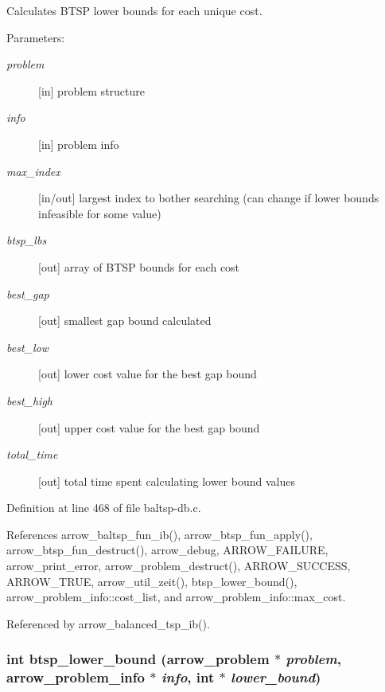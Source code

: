 Calculates BTSP lower bounds for each unique cost. 

\begin{Desc}
\item[Parameters:]
\begin{description}
\item[{\em problem}]\mbox{[}in\mbox{]} problem structure \item[{\em info}]\mbox{[}in\mbox{]} problem info \item[{\em max\_\-index}]\mbox{[}in/out\mbox{]} largest index to bother searching (can change if lower bounds infeasible for some value) \item[{\em btsp\_\-lbs}]\mbox{[}out\mbox{]} array of BTSP bounds for each cost \item[{\em best\_\-gap}]\mbox{[}out\mbox{]} smallest gap bound calculated \item[{\em best\_\-low}]\mbox{[}out\mbox{]} lower cost value for the best gap bound \item[{\em best\_\-high}]\mbox{[}out\mbox{]} upper cost value for the best gap bound \item[{\em total\_\-time}]\mbox{[}out\mbox{]} total time spent calculating lower bound values \end{description}
\end{Desc}


Definition at line 468 of file baltsp-db.c.

References arrow\_\-baltsp\_\-fun\_\-ib(), arrow\_\-btsp\_\-fun\_\-apply(), arrow\_\-btsp\_\-fun\_\-destruct(), arrow\_\-debug, ARROW\_\-FAILURE, arrow\_\-print\_\-error, arrow\_\-problem\_\-destruct(), ARROW\_\-SUCCESS, ARROW\_\-TRUE, arrow\_\-util\_\-zeit(), btsp\_\-lower\_\-bound(), arrow\_\-problem\_\-info::cost\_\-list, and arrow\_\-problem\_\-info::max\_\-cost.

Referenced by arrow\_\-balanced\_\-tsp\_\-ib().\hypertarget{lib_2baltsp_2baltsp-db_8c_90a22293c99499a2da22fd0d1a16acb4}{
\subsubsection[{btsp\_\-lower\_\-bound}]{\setlength{\rightskip}{0pt plus 5cm}int btsp\_\-lower\_\-bound ({\bf arrow\_\-problem} $\ast$ {\em problem}, \/  {\bf arrow\_\-problem\_\-info} $\ast$ {\em info}, \/  int $\ast$ {\em lower\_\-bound})}}
\label{lib_2baltsp_2baltsp-db_8c_90a22293c99499a2da22fd0d1a16acb4}


